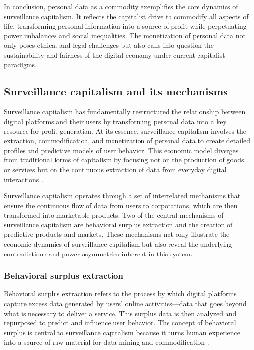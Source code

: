 \begin{refsection}
In conclusion, personal data as a commodity exemplifies the core dynamics of surveillance capitalism. It reflects the capitalist drive to commodify all aspects of life, transforming personal information into a source of profit while perpetuating power imbalances and social inequalities. The monetization of personal data not only poses ethical and legal challenges but also calls into question the sustainability and fairness of the digital economy under current capitalist paradigms.

\subsection{Surveillance capitalism and its mechanisms}

Surveillance capitalism has fundamentally restructured the relationship between digital platforms and their users by transforming personal data into a key resource for profit generation. At its essence, surveillance capitalism involves the extraction, commodification, and monetization of personal data to create detailed profiles and predictive models of user behavior. This economic model diverges from traditional forms of capitalism by focusing not on the production of goods or services but on the continuous extraction of data from everyday digital interactions \cite[pp.~8-10]{zuboff2020age}.

Surveillance capitalism operates through a set of interrelated mechanisms that ensure the continuous flow of data from users to corporations, which are then transformed into marketable products. Two of the central mechanisms of surveillance capitalism are behavioral surplus extraction and the creation of predictive products and markets. These mechanisms not only illustrate the economic dynamics of surveillance capitalism but also reveal the underlying contradictions and power asymmetries inherent in this system.

\subsubsection{Behavioral surplus extraction}

Behavioral surplus extraction refers to the process by which digital platforms capture excess data generated by users' online activities—data that goes beyond what is necessary to deliver a service. This surplus data is then analyzed and repurposed to predict and influence user behavior. The concept of behavioral surplus is central to surveillance capitalism because it turns human experience into a source of raw material for data mining and commodification \cite[pp.~78-80]{zuboff2020age}.


\end{refsection}
